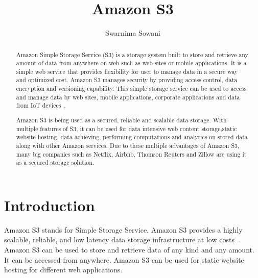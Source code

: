 
\title{Amazon S3}


\author{Swarnima Sowani}

\renewcommand{\shortauthors}{G. v. Laszewski}

\begin{abstract}

Amazon Simple Storage Service (S3) is a storage system built to store and 
retrieve any amount of data from anywhere on web such as web sites or mobile 
applications. It is a simple web service that provides flexibility for user to 
manage data in a secure way and optimized cost. Amazon S3 manages security by 
providing access control, data encryption and versioning capability. This 
simple storage service can be used to access and manage data by web sites, 
mobile applications, corporate applications and data from IoT 
devices~\cite{hid-sp18-420-amazon-S3}.


Amazon S3 is being used as a secured, reliable and scalable data storage. With 
multiple features of S3, it can be used for data intensive web content
storage,static website hosting, data achieving, performing computations and
analytics
on stored data along with other Amazon services. Due to these multiple 
advantages of Amazon S3, many big companies such as Netflix, Airbnb, Thomson 
Reuters and Zillow are using it as a secured storage solution.


\end{abstract}


\maketitle

\section{Introduction}

Amazon S3 stands for Simple Storage Service. Amazon S3 provides a highly
scalable, reliable, and low latency data storage infrastructure at low
costs~\cite{hid-sp18-420-amazon-S3-FAQ}. Amazon S3 can be used to store and
retrieve data of any kind and any amount. It can be accessed from anywhere.
Amazon S3 can be used for static website hosting for different web applications.

